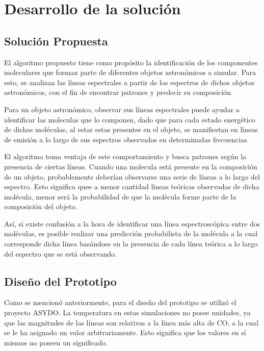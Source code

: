 \section{Desarrollo de la solución}

\subsection{Solución Propuesta}

El algoritmo propuesto tiene como propósito la identificación de los componentes moleculares que forman parte de diferentes objetos astronómicos a simular. Para esto, se analizan las líneas  espectrales a partir de los espectros de dichos objetos astronómicos, con el fin de encontrar patrones y predecir su composición.

Para un objeto astronómico, observar sus líneas espectrales puede ayudar a identificar las moleculas que lo componen, dado que para cada estado energético de dichas moléculas, al estar estas presentes en el objeto, se manifiestan en líneas de emisión a lo largo de sus espectros observados en determinadas frecuencias.

El algoritmo toma ventaja de este comportamiento y busca patrones según la presencia de ciertas líneas. Cuando una molecula está presente en la composición de un objeto, probablemente deberían observarse una serie de líneas a lo largo del espectro. Esto significa quee a menor cantidad líneas teóricas observadas de dicha molécula, menor será la probabilidad de que la molécula forme parte de la composición del objeto.

Así, si existe confusión a la hora de identificar una línea espectroscópica entre dos moléculas, es posible realizar una predicción probabilista de la molécula a la cual corresponde dicha línea basándose en la presencia de cada línea teórica a lo largo del espectro que se está observando.

\subsection{Diseño del Prototipo}

Como se mencionó anteriormente, para el diseño del prototipo se utilizó el proyecto ASYDO. La temperatura en estas simulaciones no posee unidades, ya que las magnitudes de las líneas son relativas a la línea más alta de CO, a la cual se le ha asignado un valor arbitrariamente. Esto significa que los valores en sí mismos no poseen un significado.

